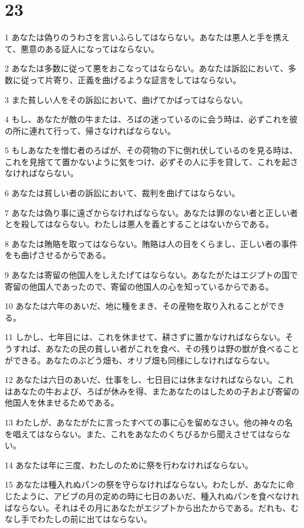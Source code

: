 \chapter{23}

\par 1 あなたは偽りのうわさを言いふらしてはならない。あなたは悪人と手を携えて、悪意のある証人になってはならない。
\par 2 あなたは多数に従って悪をおこなってはならない。あなたは訴訟において、多数に従って片寄り、正義を曲げるような証言をしてはならない。
\par 3 また貧しい人をその訴訟において、曲げてかばってはならない。
\par 4 もし、あなたが敵の牛または、ろばの迷っているのに会う時は、必ずこれを彼の所に連れて行って、帰さなければならない。
\par 5 もしあなたを憎む者のろばが、その荷物の下に倒れ伏しているのを見る時は、これを見捨てて置かないように気をつけ、必ずその人に手を貸して、これを起さなければならない。
\par 6 あなたは貧しい者の訴訟において、裁判を曲げてはならない。
\par 7 あなたは偽り事に遠ざからなければならない。あなたは罪のない者と正しい者とを殺してはならない。わたしは悪人を義とすることはないからである。
\par 8 あなたは賄賂を取ってはならない。賄賂は人の目をくらまし、正しい者の事件をも曲げさせるからである。
\par 9 あなたは寄留の他国人をしえたげてはならない。あなたがたはエジプトの国で寄留の他国人であったので、寄留の他国人の心を知っているからである。
\par 10 あなたは六年のあいだ、地に種をまき、その産物を取り入れることができる。
\par 11 しかし、七年目には、これを休ませて、耕さずに置かなければならない。そうすれば、あなたの民の貧しい者がこれを食べ、その残りは野の獣が食べることができる。あなたのぶどう畑も、オリブ畑も同様にしなければならない。
\par 12 あなたは六日のあいだ、仕事をし、七日目には休まなければならない。これはあなたの牛および、ろばが休みを得、またあなたのはしための子および寄留の他国人を休ませるためである。
\par 13 わたしが、あなたがたに言ったすべての事に心を留めなさい。他の神々の名を唱えてはならない。また、これをあなたのくちびるから聞えさせてはならない。
\par 14 あなたは年に三度、わたしのために祭を行わなければならない。
\par 15 あなたは種入れぬパンの祭を守らなければならない。わたしが、あなたに命じたように、アビブの月の定めの時に七日のあいだ、種入れぬパンを食べなければならない。それはその月にあなたがエジプトから出たからである。だれも、むなし手でわたしの前に出てはならない。
